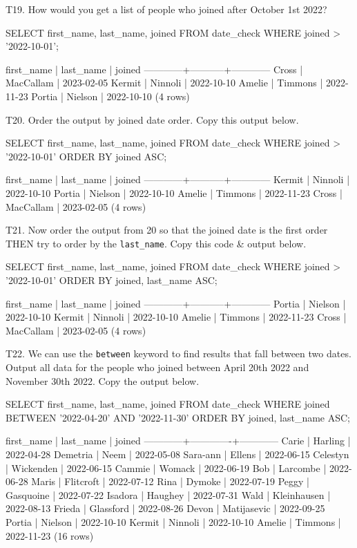 T19. How would you get a list of people who joined after October 1st 2022?
\begin{sql}
SELECT first_name, last_name, joined FROM date_check
WHERE joined > '2022-10-01';
\end{sql}
\begin{pseudo}
 first_name | last_name |   joined
------------+-----------+------------
 Cross      | MacCallam | 2023-02-05
 Kermit     | Ninnoli   | 2022-10-10
 Amelie     | Timmons   | 2022-11-23
 Portia     | Nielson   | 2022-10-10
(4 rows)
\end{pseudo}

T20. Order the output by joined date order. Copy this output below.
\begin{sql}
SELECT first_name, last_name, joined FROM date_check
WHERE joined > '2022-10-01'
ORDER BY joined ASC;
\end{sql}
\begin{pseudo}
 first_name | last_name |   joined
------------+-----------+------------
 Kermit     | Ninnoli   | 2022-10-10
 Portia     | Nielson   | 2022-10-10
 Amelie     | Timmons   | 2022-11-23
 Cross      | MacCallam | 2023-02-05
(4 rows)
\end{pseudo}

T21. Now order the output from 20 so that the joined date is the first order THEN try to order by the \verb|last_name|. Copy this code \& output below.
\begin{sql}
SELECT first_name, last_name, joined FROM date_check
WHERE joined > '2022-10-01'
ORDER BY joined, last_name ASC;
\end{sql}
\begin{pseudo}
 first_name | last_name |   joined
------------+-----------+------------
 Portia     | Nielson   | 2022-10-10
 Kermit     | Ninnoli   | 2022-10-10
 Amelie     | Timmons   | 2022-11-23
 Cross      | MacCallam | 2023-02-05
(4 rows)
\end{pseudo}

T22. We can use the \verb|between| keyword to find results that fall between two dates. Output all data for the people who joined between April 20th 2022 and November 30th 2022. Copy the output below.
\begin{sql}
SELECT first_name, last_name, joined FROM date_check
WHERE joined BETWEEN '2022-04-20' AND '2022-11-30'
ORDER BY joined, last_name ASC;
\end{sql}
\begin{pseudo}
 first_name |  last_name  |   joined
------------+-------------+------------
 Carie      | Harling     | 2022-04-28
 Demetria   | Neem        | 2022-05-08
 Sara-ann   | Ellens      | 2022-06-15
 Celestyn   | Wickenden   | 2022-06-15
 Cammie     | Womack      | 2022-06-19
 Bob        | Larcombe    | 2022-06-28
 Maris      | Flitcroft   | 2022-07-12
 Rina       | Dymoke      | 2022-07-19
 Peggy      | Gasquoine   | 2022-07-22
 Isadora    | Haughey     | 2022-07-31
 Wald       | Kleinhausen | 2022-08-13
 Frieda     | Glassford   | 2022-08-26
 Devon      | Matijasevic | 2022-09-25
 Portia     | Nielson     | 2022-10-10
 Kermit     | Ninnoli     | 2022-10-10
 Amelie     | Timmons     | 2022-11-23
(16 rows)
\end{pseudo}